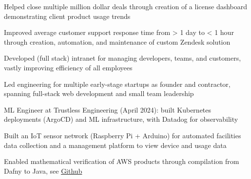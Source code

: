\documentclass[]{jack-resume}
\begin{document}
\begin{tightemize}
    \item Helped close multiple million dollar deals through creation of a license dashboard demonstrating client product usage trends
    \item Improved average customer support response time from > 1 day to < 1 hour through creation, automation, and maintenance of custom Zendesk solution
    \item Developed (full stack) intranet for managing developers, teams, and customers, vastly improving efficiency of all employees
\end{tightemize}
\sectionsep

\begin{tightemize}
    \item Led engineering for multiple early-stage startups as founder and contractor, spanning full-stack web development and small team leadership
    \item ML Engineer at Trustless Engineering (April 2024): built Kubernetes deployments (ArgoCD) and ML infrastructure, with Datadog for observability
\end{tightemize}
\sectionsep

\begin{tightemize}
    \item Built an IoT sensor network (Raspberry Pi + Arduino) for automated facilities data collection and a management platform to view device and usage data
\end{tightemize}

\begin{tightemize}
    \item Enabled mathematical verification of AWS products through compilation from Dafny to Java, see \href{https://github.com/dafny-lang/dafny}{Github \ExternalLink}
\end{tightemize}
\sectionsep
\end{document}
